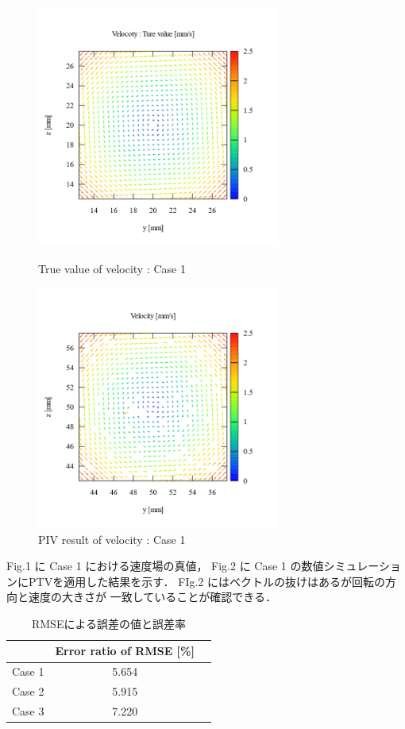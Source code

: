 \documentclass[twocolumn,a4j]{jsarticle}
\begin{document}
\begin{figure}[htbp]
  \footnotesize
  \begin{center}
    \includegraphics[width=80mm]{../images/vector_true_value.png}
    \caption{True value of velocity : Case 1}
    \includegraphics[width=80mm]{../images/vector_simulation.png}
    \caption{PIV result of velocity : Case 1}
  \end{center}
\end{figure}

Fig.1 に Case 1 における速度場の真値，
Fig.2 に Case 1 の数値シミュレーションにPTVを適用した結果を示す．
FIg.2 にはベクトルの抜けはあるが回転の方向と速度の大きさが
一致していることが確認できる．

\newpage

\begin{table}[hbtp]
  \label{table:data_type}
  \caption{RMSEによる誤差の値と誤差率}
  \centering
  \begin{tabular}{ c c c }
    \hline
           & Error ratio of RMSE [\%] \\ \hline \hline
    Case 1 & 5.654                    \\ \hline
    Case 2 & 5.915                    \\ \hline
    Case 3 & 7.220                    \\ \hline
  \end{tabular}
\end{table}
\end{document}
